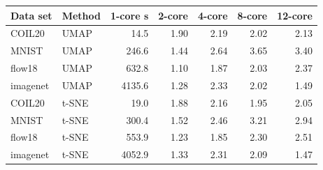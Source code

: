 \begin{tabular}{llrrrrr}
\toprule
Data set & Method & 1-core s & 2-core & 4-core & 8-core & 12-core \\
\midrule
COIL20 & UMAP & 14.5 & 1.90 & 2.19 & 2.02 & 2.13 \\
MNIST & UMAP & 246.6 & 1.44 & 2.64 & 3.65 & 3.40 \\
flow18 & UMAP & 632.8 & 1.10 & 1.87 & 2.03 & 2.37 \\
imagenet & UMAP & 4135.6 & 1.28 & 2.33 & 2.02 & 1.49 \\
COIL20 & t-SNE & 19.0 & 1.88 & 2.16 & 1.95 & 2.05 \\
MNIST & t-SNE & 300.4 & 1.52 & 2.46 & 3.21 & 2.94 \\
flow18 & t-SNE & 553.9 & 1.23 & 1.85 & 2.30 & 2.51 \\
imagenet & t-SNE & 4052.9 & 1.33 & 2.31 & 2.09 & 1.47 \\
\bottomrule
\end{tabular}
